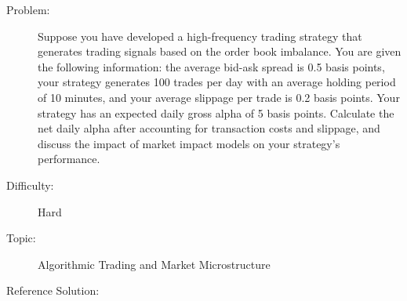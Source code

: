 \documentclass{article}%
\begin{document}
\begin{description}%
\item[Problem: ]%
Suppose you have developed a high{-}frequency trading strategy that generates trading signals based on the order book imbalance. You are given the following information: the average bid{-}ask spread is 0.5 basis points, your strategy generates 100 trades per day with an average holding period of 10 minutes, and your average slippage per trade is 0.2 basis points. Your strategy has an expected daily gross alpha of 5 basis points. Calculate the net daily alpha after accounting for transaction costs and slippage, and discuss the impact of market impact models on your strategy's performance.%
\item[Difficulty: ]%
Hard%
\item[Topic: ]%
Algorithmic Trading and Market Microstructure%
\item[Reference Solution: ]%

\end{description}
\end{document}
